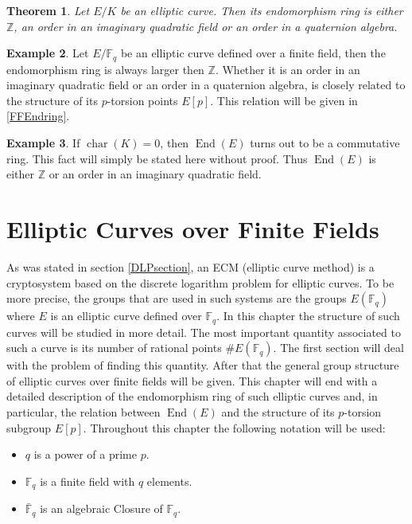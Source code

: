 \documentclass{article}
\numberwithin{equation}{section}
\newtheorem{theorem}{Theorem}[subsection]
\theoremstyle{definition}
\newtheorem{example}[theorem]{Example}
\newcommand{\ZZ}{{\mathbb Z}} %
\newcommand{\FF}[1]{{\mathbb F}_{#1}} %
\newcommand{\Char}[1]{\operatorname{char} (#1)} %
\newcommand{\Endring}[1]{\operatorname{End} (#1)} %
\begin{document}
\begin{theorem}\label{endringthm}
Let $E/K$ be an elliptic curve. Then its endomorphism ring is either $\ZZ$, an order in an imaginary quadratic field or an order in a quaternion algebra.
\end{theorem}

\begin{example}\label{ffEndstucture}
Let $E/\FF{q}$ be an elliptic curve defined over a finite field, then the endomorphism ring is always larger then $\ZZ$. Whether it is an order in an imaginary quadratic field or an order in a quaternion algebra, is closely related to the structure of its $p$-torsion points $E[p]$. This relation will be given in \ref{FFEndring}. 
\end{example} 

\begin{example}
If $\Char{K}=0$, then $\Endring{E}$ turns out to be a commutative ring. This fact will simply be stated here without proof. Thus $\Endring{E}$ is either $\ZZ$ or an order in an imaginary quadratic field.
\end{example}\newpage











\section{Elliptic Curves over Finite Fields}\label{ellipticcurvesoverffsection}
As was stated in section \ref{DLPsection}, an ECM (elliptic curve method) is a cryptosystem based on the discrete logarithm problem for elliptic curves. To be more precise, the groups that are used in such systems are the groups $E(\FF{q})$ where $E$ is an elliptic curve defined over $\FF{q}$. In this chapter the structure of such curves will be studied in more detail. The most important quantity associated to such a curve is its number of rational points $\#E(\FF{q})$. The first section will deal with the problem of finding this quantity. After that the general group structure of elliptic curves over finite fields will be given. This chapter will end with a detailed description of the endomorphism ring of such elliptic curves and, in particular, the relation between $\Endring{E}$ and the structure of its $p$-torsion subgroup $E[p]$. Throughout this chapter the following notation will be used:
\begin{itemize}
\item $q$ is a power of a prime $p$.
\item $\mathbb{F}_q$ is a finite field with $q$ elements.
\item $\bar{\mathbb{F}}_q$ is an algebraic Closure of $\mathbb{F}_q$.
\end{itemize}
\end{document}

